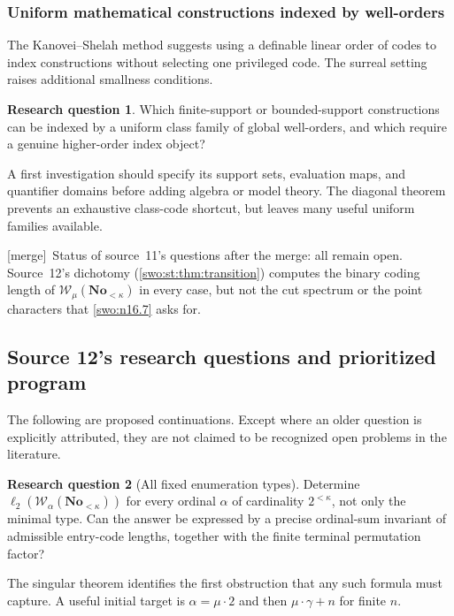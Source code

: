 \documentclass[11pt]{article}
\theoremstyle{definition}
\newtheorem{question}[question]{Research question}
\theoremstyle{remark}
\newcommand{\No}{\mathbf{No}}
\newcommand{\WO}{\mathcal W}
\newcommand{\bl}{\ell_2}
\newcommand{\merge}{\textsf{[merge]}}
\begin{document}
\subsubsection{Uniform mathematical constructions indexed by well-orders}

The Kanovei--Shelah method suggests using a definable
linear order of codes to index constructions without
selecting one privileged code. The surreal setting
raises additional smallness conditions.

\begin{question}\label{swo:n16.10}
Which finite-support or bounded-support constructions
can be indexed by a uniform class family of global
well-orders, and which require a genuine higher-order
index object?
\end{question}

A first investigation should specify its support sets,
evaluation maps, and quantifier domains before adding
algebra or model theory. The diagonal theorem prevents
an exhaustive class-code shortcut, but leaves many
useful uniform families available.


\merge\ Status of source~11's questions after the merge: all remain open.
Source~12's dichotomy (\cref{swo:st:thm:transition}) computes the binary
coding length of $\WO_\mu(\No_{<\kappa})$ in every case, but not the cut
spectrum or the point characters that \cref{swo:n16.7} asks for.

\subsection{Source 12's research questions and prioritized program}
\label{swo:st:sec:questions}

The following are proposed continuations. Except where an older question
is explicitly attributed, they are not claimed to be recognized open
problems in the literature.

\begin{question}[All fixed enumeration types]\label{swo:st:n14.1}
Determine $\bl(\WO_\alpha(\No_{<\kappa}))$ for every ordinal $\alpha$ of
cardinality $2^{<\kappa}$, not only the minimal type. Can the answer be
expressed by a precise ordinal-sum invariant of admissible entry-code
lengths, together with the finite terminal permutation factor?
\end{question}
The singular theorem identifies the first obstruction that any such
formula must capture. A useful initial target is
$\alpha=\mu\cdot2$ and then $\mu\cdot\gamma+n$ for finite $n$.
\end{document}
